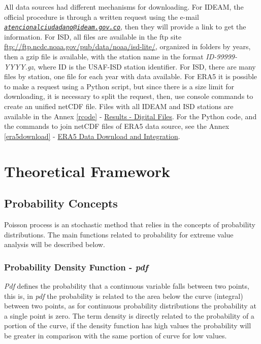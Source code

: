 \documentclass[12pt,oneside]{reedthesis}
\begin{document}
All data sources had different mechanisms for downloading. For IDEAM, the official procedure is through a written request using the e-mail \emph{\href{mailto:atencionalciudadano@ideam.gov.co}{\nolinkurl{atencionalciudadano@ideam.gov.co}}}, then they will provide a link to get the information. For ISD, all files are available in the ftp site \url{ftp://ftp.ncdc.noaa.gov/pub/data/noaa/isd-lite/}, organized in folders by years, then a gzip file is available, with the station name in the format \emph{ID-99999-YYYY.gz}, where ID is the USAF-ISD station identifier. For ISD, there are many files by station, one file for each year with data available. For ERA5 it is possible to make a request using a Python script, but since there is a size limit for downloading, it is necessary to split the request, then, use console commands to create an unified netCDF file. Files with all IDEAM and ISD stations are available in the Annex \ref{rcode} - \protect\hyperlink{results}{Results - Digital Files}. For the Python code, and the commands to join netCDF files of ERA5 data source, see the Annex \ref{era5download} - \protect\hyperlink{era5download}{ERA5 Data Download and Integration}.

\clearpage

\hypertarget{rmd-thefra}{%
\chapter{Theoretical Framework}\label{rmd-thefra}}

\hypertarget{probability-concepts}{%
\section{Probability Concepts}\label{probability-concepts}}

Poisson process is an stochastic method that relies in the concepts of probability distributions. The main functions related to probability for extreme value analysis will be described below.

\hypertarget{probability-density-function---pdf}{%
\subsection{\texorpdfstring{Probability Density Function - \emph{pdf}}{Probability Density Function - pdf}}\label{probability-density-function---pdf}}

\emph{Pdf} defines the probability that a continuous variable falls between two points, this is, in \emph{pdf} the probability is related to the area below the curve (integral) between two points, as for continuous probability distributions the probability at a single point is zero. The term density is directly related to the probability of a portion of the curve, if the density function has high values the probability will be greater in comparison with the same portion of curve for low values.
\end{document}
